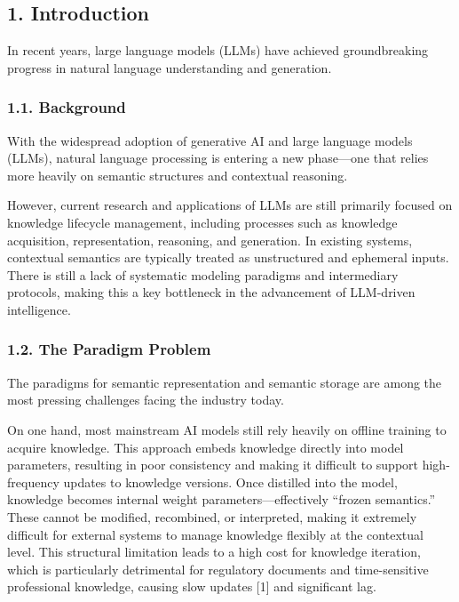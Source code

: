 \documentclass[conference]{IEEEtran}
\begin{document}
\subsection{1. Introduction}\label{1-introduction}

In recent years, large language models (LLMs) have achieved
groundbreaking progress in natural language understanding and
generation.

\subsubsection{1.1. Background}\label{11-background}

With the widespread adoption of generative AI and large language models
(LLMs), natural language processing is entering a new phase---one that
relies more heavily on semantic structures and contextual reasoning.

However, current research and applications of LLMs are still primarily
focused on knowledge lifecycle management, including processes such as
knowledge acquisition, representation, reasoning, and generation. In
existing systems, contextual semantics are typically treated as
unstructured and ephemeral inputs. There is still a lack of systematic
modeling paradigms and intermediary protocols, making this a key
bottleneck in the advancement of LLM-driven intelligence.

\subsubsection{1.2. The Paradigm Problem}\label{12-the-paradigm-problem}

The paradigms for semantic representation and semantic storage are among
the most pressing challenges facing the industry today.

On one hand, most mainstream AI models still rely heavily on offline
training to acquire knowledge. This approach embeds knowledge directly
into model parameters, resulting in poor consistency and making it
difficult to support high-frequency updates to knowledge versions. Once
distilled into the model, knowledge becomes internal weight
parameters---effectively ``frozen semantics.'' These cannot be modified,
recombined, or interpreted, making it extremely difficult for external
systems to manage knowledge flexibly at the contextual level. This
structural limitation leads to a high cost for knowledge iteration,
which is particularly detrimental for regulatory documents and
time-sensitive professional knowledge, causing slow updates {[}1{]} and
significant lag.
\end{document}
